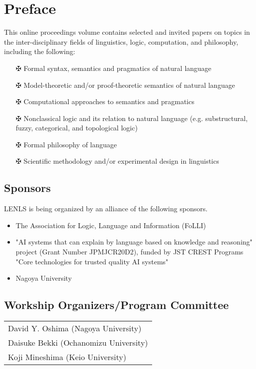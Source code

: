 \documentclass[12pt]{jarticle}
\begin{document}
\newpage

\vspace*{20cm}
\vfill
\begin{large}

\end{large}

\newpage
\pagestyle{plain}

\newpage
\section*{Preface}
This online proceedings volume contains selected and invited papers on topics in the inter-disciplinary fields of linguistics, logic, computation, and philosophy, including the following:
\begin{itemize}
\item[$\maltese$] Formal syntax, semantics and pragmatics of natural language
\item[$\maltese$] Model-theoretic and/or proof-theoretic semantics of natural language
\item[$\maltese$] Computational approaches to semantics and pragmatics
\item[$\maltese$] Nonclassical logic and its relation to natural language 
  (e.g. substructural, fuzzy, categorical, and topological logic)
\item[$\maltese$] Formal philosophy of language
\item[$\maltese$] Scientific methodology and/or experimental design in linguistics
\end{itemize}

\subsection*{Sponsors}
LENLS is being organized by an alliance of the following sponsors.
\begin{itemize}
\item The Association for Logic, Language and Information (FoLLI)
\item "AI systems that can explain by language based on knowledge and reasoning" project (Grant Number JPMJCR20D2), funded by JST CREST Programs "Core technologies for trusted quality AI systems"
\item Nagoya University
\end{itemize}

\subsection*{Workship Organizers/Program Committee}
\begin{flushleft}
\begin{tabular}{l}
David Y. Oshima (Nagoya University) \\
Daisuke Bekki (Ochanomizu University) \\
Koji Mineshima (Keio University) \\

\end{tabular}
\end{flushleft}
\newpage
  
  
\end{document}
